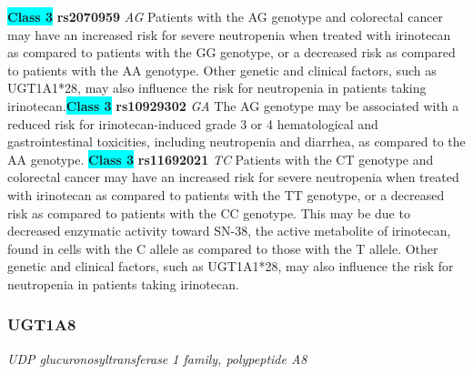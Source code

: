 \documentclass{report}
\begin{document}
\textbf{\colorbox{cyan} {Class 3}} \textbf{ rs2070959 } \textit{ AG }
Patients with the AG genotype and colorectal cancer may have an increased risk for severe neutropenia when treated with irinotecan as compared to patients with the GG genotype, or a decreased risk as compared to patients with the AA genotype. Other genetic and clinical factors, such as UGT1A1*28, may also influence the risk for neutropenia in patients taking irinotecan.\newline\textbf{\colorbox{cyan} {Class 3}} \textbf{ rs10929302 } \textit{ GA }
The AG genotype may be associated with a reduced risk for irinotecan-induced grade 3 or 4 hematological and gastrointestinal toxicities, including neutropenia and diarrhea, as compared to the AA genotype. \newline\textbf{\colorbox{cyan} {Class 3}} \textbf{ rs11692021 } \textit{ TC }
Patients with the CT genotype and colorectal cancer may have an increased risk for severe neutropenia when treated with irinotecan as compared to patients with the TT genotype, or a decreased risk as compared to patients with the CC genotype. This may be due to decreased enzymatic activity toward SN-38, the active metabolite of irinotecan, found in cells with the C allele as compared to those with the T allele. Other genetic and clinical factors, such as UGT1A1*28, may also influence the risk for neutropenia in patients taking irinotecan.\newline\subsubsection{ UGT1A8 }
\textit{ UDP glucuronosyltransferase 1 family, polypeptide A8 }
\end{document}
